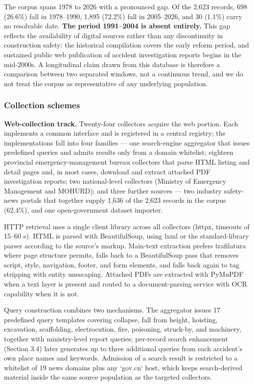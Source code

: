 \documentclass[11pt]{article}
\begin{document}
The corpus spans 1978 to 2026 with a pronounced gap. Of the 2,623 records, 698 (26.6\%) fall in 1978--1990, 1,895 (72.2\%) fall in 2005--2026, and 30 (1.1\%) carry no resolvable date. \textbf{The period 1991--2004 is absent entirely.} This gap reflects the availability of digital sources rather than any discontinuity in construction safety: the historical compilation covers the early reform period, and sustained public web publication of accident investigation reports begins in the mid-2000s. A longitudinal claim drawn from this database is therefore a comparison between two separated windows, not a continuous trend, and we do not treat the corpus as representative of any underlying population.

\subsubsection{Collection schemes}
\textbf{Web-collection track.} Twenty-four collectors acquire the web portion. Each implements a common interface and is registered in a central registry; the implementations fall into four families --- one search-engine aggregator that issues predefined queries and admits results only from a domain whitelist; eighteen provincial emergency-management bureau collectors that parse HTML listing and detail pages and, in most cases, download and extract attached PDF investigation reports; two national-level collectors (Ministry of Emergency Management and MOHURD); and three further sources --- two industry safety-news portals that together supply 1,636 of the 2,623 records in the corpus (62.4\%), and one open-government dataset importer.

HTTP retrieval uses a single client library across all collectors (httpx, timeouts of 15--60 s). HTML is parsed with BeautifulSoup, using lxml or the standard-library parser according to the source's markup. Main-text extraction prefers trafilatura where page structure permits, falls back to a BeautifulSoup pass that removes script, style, navigation, footer, and form elements, and falls back again to tag stripping with entity unescaping. Attached PDFs are extracted with PyMuPDF when a text layer is present and routed to a document-parsing service with OCR capability when it is not.

Query construction combines two mechanisms. The aggregator issues 17 predefined query templates covering collapse, fall from height, hoisting, excavation, scaffolding, electrocution, fire, poisoning, struck-by, and machinery, together with ministry-level report queries; per-record search enhancement (Section 3.4) later generates up to three additional queries from each accident's own place names and keywords. Admission of a search result is restricted to a whitelist of 19 news domains plus any `gov.\allowbreak{}cn` host, which keeps search-derived material inside the same source population as the targeted collectors.
\end{document}

